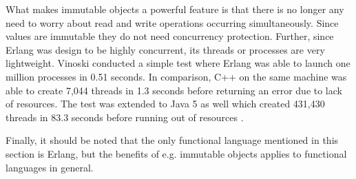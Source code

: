 \documentclass[conference]{IEEEtran}
\begin{document}
What makes immutable objects a powerful feature is that there is no longer any need to worry about read and write operations occurring simultaneously. Since values are immutable they do not need concurrency protection. Further, since Erlang was design to be highly concurrent, its threads or processes are very lightweight. Vinoski conducted a simple test where Erlang was able to launch one million processes in 0.51 seconds. In comparison, C++ on the same machine was able to create 7,044 threads in 1.3 seconds before returning an error due to lack of resources. The test was extended to Java 5 as well which created 431,430 threads in 83.3 seconds before running out of resources \cite{con}.

Finally, it should be noted that the only functional language mentioned in this section is Erlang, but the benefits of e.g. immutable objects applies to functional languages in general.





%
%
\end{document}
